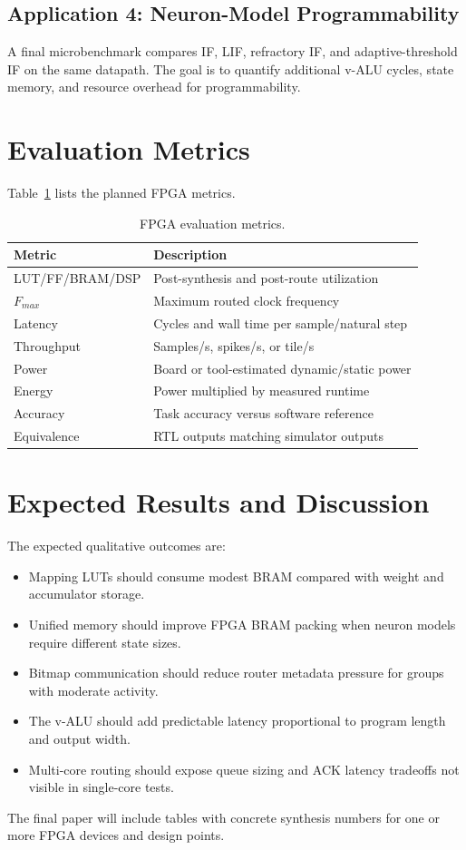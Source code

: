 \documentclass[10pt,conference]{IEEEtran}
\begin{document}
\subsection{Application 4: Neuron-Model Programmability}
A final microbenchmark compares IF, LIF, refractory IF, and adaptive-threshold IF on the same datapath. The goal is to quantify additional v-ALU cycles, state memory, and resource overhead for programmability.

\section{Evaluation Metrics}
Table~\ref{tab:eval} lists the planned FPGA metrics.

\begin{table}[t]
\centering
\caption{FPGA evaluation metrics.}
\label{tab:eval}
\begin{tabular}{ll}
\toprule
Metric & Description \\
\midrule
LUT/FF/BRAM/DSP & Post-synthesis and post-route utilization \\
$F_{max}$ & Maximum routed clock frequency \\
Latency & Cycles and wall time per sample/natural step \\
Throughput & Samples/s, spikes/s, or tile/s \\
Power & Board or tool-estimated dynamic/static power \\
Energy & Power multiplied by measured runtime \\
Accuracy & Task accuracy versus software reference \\
Equivalence & RTL outputs matching simulator outputs \\
\bottomrule
\end{tabular}
\end{table}

\section{Expected Results and Discussion}
The expected qualitative outcomes are:
\begin{itemize}
    \item Mapping LUTs should consume modest BRAM compared with weight and accumulator storage.
    \item Unified memory should improve FPGA BRAM packing when neuron models require different state sizes.
    \item Bitmap communication should reduce router metadata pressure for groups with moderate activity.
    \item The v-ALU should add predictable latency proportional to program length and output width.
    \item Multi-core routing should expose queue sizing and ACK latency tradeoffs not visible in single-core tests.
\end{itemize}
The final paper will include tables with concrete synthesis numbers for one or more FPGA devices and design points.
\end{document}
